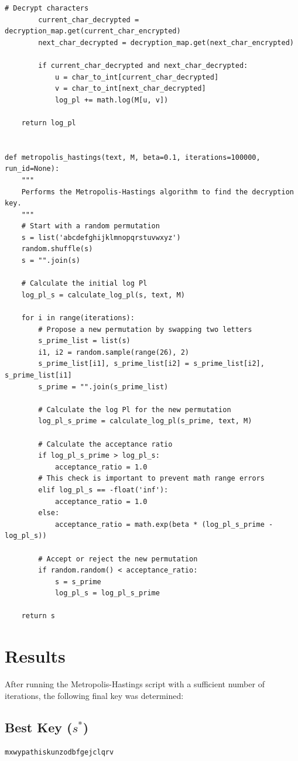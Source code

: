 \documentclass{article}
\begin{document}
\begin{lstlisting}[style=py, caption={Metropolis-Hastings implementation from \texttt{MATH541PS1/HW2/markov.py}}]
        # Decrypt characters
        current_char_decrypted = decryption_map.get(current_char_encrypted)
        next_char_decrypted = decryption_map.get(next_char_encrypted)

        if current_char_decrypted and next_char_decrypted:
            u = char_to_int[current_char_decrypted]
            v = char_to_int[next_char_decrypted]
            log_pl += math.log(M[u, v])
            
    return log_pl


def metropolis_hastings(text, M, beta=0.1, iterations=100000, run_id=None):
    """
    Performs the Metropolis-Hastings algorithm to find the decryption key.
    """
    # Start with a random permutation
    s = list('abcdefghijklmnopqrstuvwxyz')
    random.shuffle(s)
    s = "".join(s)
    
    # Calculate the initial log Pl
    log_pl_s = calculate_log_pl(s, text, M)
    
    for i in range(iterations):
        # Propose a new permutation by swapping two letters
        s_prime_list = list(s)
        i1, i2 = random.sample(range(26), 2)
        s_prime_list[i1], s_prime_list[i2] = s_prime_list[i2], s_prime_list[i1]
        s_prime = "".join(s_prime_list)
        
        # Calculate the log Pl for the new permutation
        log_pl_s_prime = calculate_log_pl(s_prime, text, M)
        
        # Calculate the acceptance ratio
        if log_pl_s_prime > log_pl_s:
            acceptance_ratio = 1.0
        # This check is important to prevent math range errors
        elif log_pl_s == -float('inf'):
            acceptance_ratio = 1.0 
        else:
            acceptance_ratio = math.exp(beta * (log_pl_s_prime - log_pl_s))
        
        # Accept or reject the new permutation
        if random.random() < acceptance_ratio:
            s = s_prime
            log_pl_s = log_pl_s_prime
            
    return s
\end{lstlisting}

\section*{Results}
After running the Metropolis-Hastings script with a sufficient number of iterations, the following final key was determined:

\subsection*{Best Key ($s^*$)}
\begin{verbatim}
mxwypathiskunzodbfgejclqrv
\end{verbatim}
\end{document}
